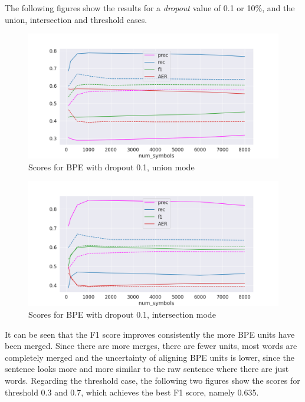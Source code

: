 The following figures show the results for a \emph{dropout} value of 0.1 or 10\%, and the union, intersection and threshold cases.

 \begin{figure}[!ht]
     \centering
     \includegraphics[width=12cm]{../reports/scores_dropout_bpe/space/0.1/union_fastalign.png}
     \caption{Scores for BPE with dropout 0.1, union mode}
 \end{figure}
 
 \begin{figure}[!ht]
     \centering
     \includegraphics[width=11.5cm]{../reports/scores_dropout_bpe/space/0.1/inter_fastalign.png}
     \caption{Scores for BPE with dropout 0.1, intersection mode}
 \end{figure}

It can be seen that the F1 score improves consistently the more BPE units have been merged. Since there are more merges, there are fewer units, most words are completely merged and the uncertainty of aligning BPE units is lower, since the sentence looks more and more similar to the raw sentence where there are just words. Regarding the threshold case, the following two figures show the scores for threshold 0.3 and 0.7, which achieves the best F1 score, namely 0.635.

